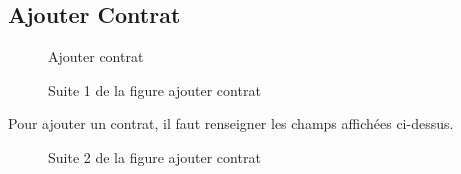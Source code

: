 \documentclass[a4paper]{report}
\begin{document}
\subsection{Ajouter Contrat}
\begin{figure}[H]
	\begin{center}
		\caption{Ajouter contrat}
	\end{center}
\end{figure}
\begin{figure}[H]
	\begin{center}
		\caption{Suite 1 de la figure ajouter contrat}
	\end{center}
\end{figure}
Pour ajouter un contrat, il faut renseigner les champs affichées ci-dessus.
\begin{figure}[H]
	\begin{center}
		\caption{Suite 2 de la figure ajouter contrat}
	\end{center}
\end{figure}
\end{document}
